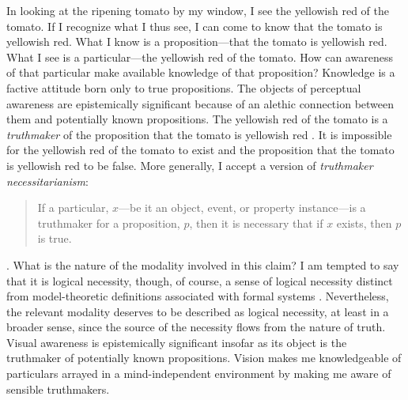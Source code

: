 \documentclass[12pt]{article}
\begin{document}
In looking at the ripening tomato by my window, I see the yellowish red of the tomato. If I recognize what I thus see, I can come to know that the tomato is yellowish red. What I know is a proposition---that the tomato is yellowish red. What I see is a particular---the yellowish red of the tomato. How can awareness of that particular make available knowledge of that proposition? Knowledge is a factive attitude born only to true propositions. The objects of perceptual awareness are epistemically significant because of an alethic connection between them and potentially known propositions. The yellowish red of the tomato is a \emph{truthmaker} of the proposition that the tomato is yellowish red \citep[see][]{Johnston:2006uq}. It is impossible for the yellowish red of the tomato to exist and the proposition that the tomato is yellowish red to be false. More generally, I accept a version of \emph{truthmaker necessitarianism}:
\begin{quote}
	If a particular, \( x \)---be it an object, event, or property instance---is a truthmaker for a proposition, \( p \), then it is necessary that if \( x \) exists, then \( p \) is true. 
\end{quote}
\citep[for a survey of recent work on truthmakers see][]{Rodriguez-Pereyra:2006fk}. What is the nature of the modality involved in this claim? I am tempted to say that it is logical necessity, though, of course, a sense of logical necessity distinct from model-theoretic definitions associated with formal systems  \citep[for doubts about model-theoretic definitions of logical necessity see][]{Etchemendy:1988et,Etchemendy:1988sa}. Nevertheless, the relevant modality deserves to be described as logical necessity, at least in a broader sense, since the source of the necessity flows from the nature of truth. Visual awareness is epistemically significant insofar as its object is the truthmaker of potentially known propositions. Vision makes me knowledgeable of particulars arrayed in a mind-independent environment by making me aware of sensible truthmakers.

\end{document}
